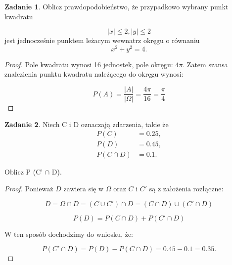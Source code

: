 \documentclass[11pt]{article}
\theoremstyle{definition}
\newtheorem{zadanie}{Zadanie}
\numberwithin{zadanie}{section}
\begin{document}
\begin{zadanie}
    Oblicz prawdopodobieństwo, że przypadkowo wybrany punkt kwadratu

    $$|x| \leq 2, |y| \leq 2$$
    jest jednocześnie punktem leżacym wewnatrz okręgu o równaniu
    $$x^2 + y^2 = 4.$$
\end{zadanie}
\begin{proof}
    Pole kwadratu wynosi 16 jednostek, pole okręgu: $4\pi$. Zatem szansa znalezienia punktu kwadratu należącego do okręgu wynosi:

    $$P(A) = \frac{|A|}{|\Omega|} = \frac{4\pi}{16} = \frac\pi4$$
\end{proof}

\begin{zadanie}
    Niech C i D oznaczają zdarzenia, takie że
    \begin{align*}
        P (C)        & = 0.25, \\
        P (D)        & = 0.45, \\
        P (C \cap D) & = 0.1.
    \end{align*}

    Oblicz P (C' $\cap$ D).
\end{zadanie}
\begin{proof}

    Ponieważ $D$ zawiera się w $\Omega$ oraz $C$ i $C'$ są z założenia rozłączne:

    $$D = \Omega \cap D = (C \cup C') \cap D = (C\cap D)\cup (C' \cap D)$$

    $$P(D) = P(C\cap D) + P(C'\cap D)$$

    W ten sposób dochodzimy do wniosku, że:

    $$P(C'\cap D) = P(D) - P(C\cap D) = 0.45 - 0.1 = 0.35.$$
\end{proof}
\end{document}
